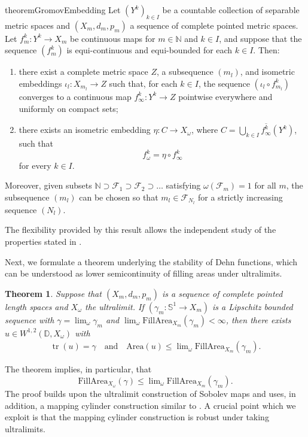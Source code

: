 \documentclass[a4paper,leqno]{amsart}
\numberwithin{equation}{section}
\newtheorem{theorem}{Theorem}[section]
\theoremstyle{remark}
\theoremstyle{remark}
\newcommand{\N}{\mathbb{N}}
\DeclareMathOperator{\trace}{tr}
\begin{document}
\begin{restatable}{theorem}{GromovEmbedding}
\label{thm:embedding-mapping-packages}
 Let $(Y^k)_{k\in I}$ be a countable collection of separable metric spaces and $(X_m, d_m, p_m)$ a sequence of complete pointed metric spaces. Let $f_m^k\colon Y^k\to X_m$ be continuous maps for $m\in\N$ and $k\in I$, and suppose that the sequence $( f_m^k )$ is equi-continuous and equi-bounded for each $k\in I$. Then:
 \begin{enumerate}
  \item there exist a complete metric space $Z$, a subsequence $(m_l)$, and isometric embeddings $\iota_l\colon X_{m_l}\to Z$ such that, for each $k\in I$, the sequence $(\iota_l\circ f_{m_l}^k)$ converges to a continuous map $f_\infty^{k} \colon Y^k \to Z$ pointwise everywhere and uniformly on compact sets;
   \item there exists an isometric embedding $\eta\colon C\to X_\omega$, where $C=\overline{\bigcup_{k\in I} f_\infty^k(Y^k)}$, such that $$f_\omega^k = \eta\circ f_\infty^k$$ for every $k\in I$.
 \end{enumerate}
 Moreover, given subsets $\N\supset \mathcal{F}_1\supset \mathcal{F}_2\supset\dots$ satisfying $\omega(\mathcal{F}_m) = 1$ for all $m$, the subsequence $(m_l)$ can be chosen so that $m_l\in \mathcal{F}_{N_l}$ for a strictly increasing sequence $( N_l )$.
\end{restatable} 
The flexibility provided by this result allows the independent study of the properties stated in . 

Next, we formulate a theorem underlying the stability of Dehn functions, which can be understood as lower semicontinuity of filling areas under ultralimits.

\begin{theorem}\label{thm:stability-introduction}
Suppose that $( X_m, d_m, p_m )$ is a sequence of complete pointed length spaces and $X_\omega$ the ultralimit. If $( \gamma_m \colon \mathbb{S}^1 \to X_m )$ is a Lipschitz bounded sequence with $\gamma = \lim\nolimits_{\omega} \gamma_m$ and $\lim\nolimits_{\omega} \mathrm{FillArea}_{X_m}( \gamma_m ) < \infty$, then there exists $u \in W^{1,2}( \mathbb{D}, X_\omega )$ with
\begin{align*}
    \trace(u) = \gamma
    \quad\text{and}\quad
    \mathrm{Area}( u )
    \leq
    \lim\nolimits_\omega \mathrm{FillArea}_{X_m}( \gamma_m ).
\end{align*}
\end{theorem}
The theorem implies, in particular, that $$\mathrm{FillArea}_{X_\omega}(\gamma)\leq \lim\nolimits_\omega \mathrm{FillArea}_{X_m}( \gamma_m ).$$
The proof builds upon the ultralimit construction of Sobolev maps and uses, in addition, a mapping cylinder construction similar to \cite{stadler-the-structure-of-minimal-surfaces-in-cat-0-spaces,Creu:22}. A crucial point which we exploit is that the mapping cylinder construction is robust under taking ultralimits.
\end{document}

